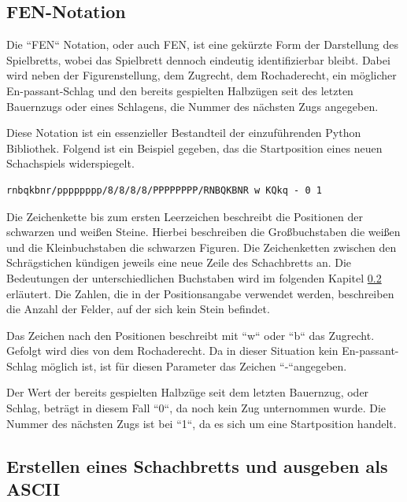 \subsection{FEN-Notation}\label{FEN-Notation}

Die ``\acs{FEN}`` Notation, oder auch \acl{FEN}, ist eine gekürzte Form der Darstellung des Spielbretts, wobei das Spielbrett dennoch eindeutig identifizierbar bleibt. Dabei wird neben der Figurenstellung, dem Zugrecht, dem Rochaderecht, ein möglicher En-passant-Schlag und den bereits gespielten Halbzügen seit des letzten Bauernzugs oder eines Schlagens, die Nummer des nächsten Zugs angegeben.\cite{FEN2019}

Diese Notation ist ein essenzieller Bestandteil der einzuführenden Python Bibliothek. Folgend ist ein Beispiel gegeben, das die Startposition eines neuen Schachspiels widerspiegelt.

\begin{Verbatim}[commandchars=\\\{\}]
rnbqkbnr/pppppppp/8/8/8/8/PPPPPPPP/RNBQKBNR w KQkq - 0 1
\end{Verbatim}

Die Zeichenkette bis zum ersten Leerzeichen beschreibt die Positionen der schwarzen und weißen Steine. Hierbei beschreiben die Großbuchstaben die weißen und die Kleinbuchstaben die schwarzen Figuren. Die Zeichenketten zwischen den Schrägstichen kündigen jeweils eine neue Zeile des Schachbretts an. Die Bedeutungen der unterschiedlichen Buchstaben wird im folgenden Kapitel \ref{erstellen-eines-schachbretts-und-ausgeben-als-ascii} erläutert. Die Zahlen, die in der Positionsangabe verwendet werden, beschreiben die Anzahl der Felder, auf der sich kein Stein befindet.

Das Zeichen nach den Positionen beschreibt mit ``w`` oder ``b`` das Zugrecht. Gefolgt wird dies von dem Rochaderecht. Da in dieser Situation kein En-passant-Schlag möglich ist, ist für diesen Parameter das Zeichen ``-``angegeben.

Der Wert der bereits gespielten Halbzüge seit dem letzten Bauernzug, oder Schlag, beträgt in diesem Fall ``0``, da noch kein Zug unternommen wurde. Die Nummer des nächsten Zugs ist bei ``1``, da es sich um eine Startposition handelt.

    \subsection{Erstellen eines Schachbretts und ausgeben als
ASCII}\label{erstellen-eines-schachbretts-und-ausgeben-als-ascii}

